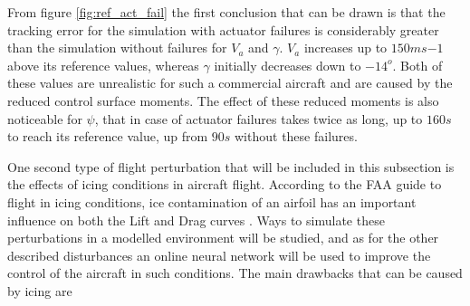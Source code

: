 From figure \ref{fig:ref_act_fail} the first conclusion that can be drawn is that the tracking error for the simulation with actuator failures is considerably greater than the simulation without failures for $V_a$ and $\gamma$. $V_a$ increases up to $150ms{-1}$ above its reference values, whereas $\gamma$ initially decreases down to $-14^o$. Both of these values are unrealistic for such a commercial aircraft and are caused by the reduced control surface moments. The effect of these reduced moments is also noticeable for $\psi$, that in case of actuator failures takes twice as long, up to $160s$ to reach its reference value, up from $90s$ without these failures.

One second type of flight perturbation that will be included in this subsection is the effects of icing conditions in aircraft flight. According to the FAA guide to flight in icing conditions, ice contamination of an airfoil has an important influence on both the Lift and Drag curves \cite{icing_cond}. Ways to simulate these perturbations in a modelled environment will be studied, and as for the other described disturbances an online neural network will be used to improve the control of the aircraft in such conditions. The main drawbacks that can be caused by icing are

